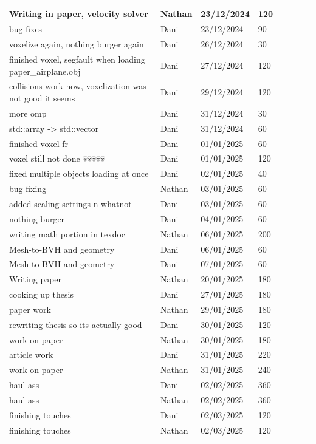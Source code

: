 \documentclass[a4paper,12pt,titlepage]{article}
\begin{document}
\begin{longtable}{|p{200pt}|l|l|l|l|l|l|l|}
	Writing in paper, velocity solver & Nathan & 23/12/2024 & 120 \\ \hline
	bug fixes & Dani & 23/12/2024 & 90 \\ \hline
	voxelize again, nothing burger again & Dani & 26/12/2024 & 30 \\ \hline
	finished  voxel, segfault when loading paper\_airplane.obj & Dani & 27/12/2024 & 120 \\ \hline
	collisions work now, voxelization was not good it seems & Dani & 29/12/2024 & 120 \\ \hline
	more omp & Dani & 31/12/2024 & 30 \\ \hline
	std::array -> std::vector & Dani & 31/12/2024 & 60 \\ \hline
	finished voxel fr & Dani & 01/01/2025 & 60 \\ \hline
	voxel still not done 💀💀💀💀💀 & Dani & 01/01/2025 & 120 \\ \hline
	fixed multiple objects loading at once & Dani & 02/01/2025 & 40 \\ \hline
	bug fixing & Nathan & 03/01/2025 & 60 \\ \hline
	added scaling settings n whatnot & Dani & 03/01/2025 & 60 \\ \hline
	nothing burger & Dani & 04/01/2025 & 60 \\ \hline
	writing math portion in texdoc & Nathan & 06/01/2025 & 200 \\ \hline
	Mesh-to-BVH and geometry & Dani & 06/01/2025 & 60 \\ \hline
	Mesh-to-BVH and geometry & Dani & 07/01/2025 & 60 \\ \hline
	Writing paper & Nathan & 20/01/2025 & 180 \\ \hline
	cooking up thesis & Dani & 27/01/2025 & 180 \\ \hline
	paper work & Nathan & 29/01/2025 & 180 \\ \hline
	rewriting thesis so its actually good & Dani & 30/01/2025 & 120 \\ \hline
	work on paper & Nathan & 30/01/2025 & 180 \\ \hline
	article work & Dani & 31/01/2025 & 220 \\ \hline
	work on paper & Nathan & 31/01/2025 & 240 \\ \hline
	haul ass & Dani & 02/02/2025 & 360 \\ \hline
	haul ass & Nathan & 02/02/2025 & 360 \\ \hline
	finishing touches & Dani & 02/03/2025 & 120 \\ \hline
	finishing touches & Nathan & 02/03/2025 & 120 \\ \hline
\end{longtable}
\end{document}
